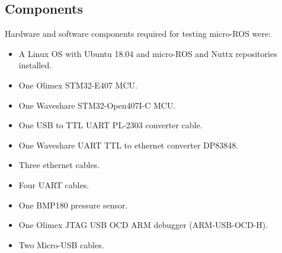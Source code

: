 \documentclass[%
xelatex,
	oneside,		%
	12pt,			%
	parskip=half,	%
	abstracton,
	chapterprefix=true%
    appendixprefix=true]
{scrbook}
\begin{document}
	\subsection{Components}
	\vspace*{0.5cm}
Hardware and software components required for testing micro-ROS were:	
	\begin{itemize}
	\item A Linux OS with Ubuntu 18.04 and micro-ROS and Nuttx repositories installed.
	\item One Olimex STM32-E407 MCU.
	\item One Waveshare STM32-Open407I-C MCU.
	\item One USB to TTL UART PL-2303 converter cable.
	\item One Waveshare UART TTL to ethernet converter DP83848.
	\item Three ethernet cables.
	\item Four UART cables.
	\item One BMP180 pressure sensor.
	\item One Olimex JTAG USB OCD ARM debugger (ARM-USB-OCD-H).
	\item Two Micro-USB cables.
	\end{itemize}
\end{document}
